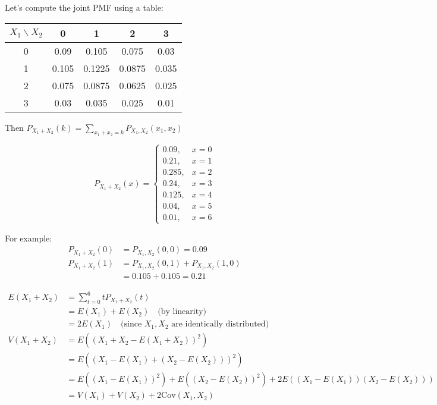\documentclass{article}
\begin{document}
    Let's compute the joint PMF using a table:
    \begin{center}
        \begin{tabular}{c|cccc}
            $X_1 \backslash X_2$ & 0 & 1 & 2 & 3 \\ \hline
            0 & 0.09 & 0.105 & 0.075 & 0.03 \\
            1 & 0.105 & 0.1225 & 0.0875 & 0.035 \\
            2 & 0.075 & 0.0875 & 0.0625 & 0.025 \\
            3 & 0.03 & 0.035 & 0.025 & 0.01
        \end{tabular}
    \end{center}

    Then $P_{X_1+X_2}(k) = \sum_{x_1+x_2=k} P_{X_1,X_2}(x_1,x_2)$
    
    \[
    P_{X_1+X_2}(x) = 
    \begin{cases}
        0.09,  & x = 0 \\
        0.21,  & x = 1 \\
        0.285, & x = 2 \\
        0.24,  & x = 3 \\
        0.125, & x = 4 \\
        0.04,  & x = 5 \\
        0.01,  & x = 6
    \end{cases}
    \]

    \noindent
    For example:
    \begin{align*}
        P_{X_1+X_2}(0) &= P_{X_1,X_2}(0,0) = 0.09 \\
        P_{X_1+X_2}(1) &= P_{X_1,X_2}(0,1) + P_{X_1,X_2}(1,0) \\
                       &= 0.105 + 0.105 = 0.21
    \end{align*}


    \begin{align*}
        E(X_1+X_2) &= \sum_{t = 0}^6 t P_{X_1+X_2}(t) \\[1em]
        &= E(X_1) + E(X_2) \quad \text{(by linearity)} \\[0.5em]
        &= 2E(X_1) \quad \text{(since $X_1,X_2$ are identically distributed)} \\[2em]
        V(X_1+X_2) &= E((X_1+X_2-E(X_1+X_2))^2) \\[0.5em]
        &= E((X_1-E(X_1)+(X_2-E(X_2)))^2) \\[0.5em]
        &= E((X_1-E(X_1))^2) + E((X_2-E(X_2))^2) + 2E((X_1-E(X_1))(X_2-E(X_2))) \\[0.5em]
        &= V(X_1) + V(X_2) + 2\text{Cov}(X_1,X_2)
    \end{align*}
\end{document}
